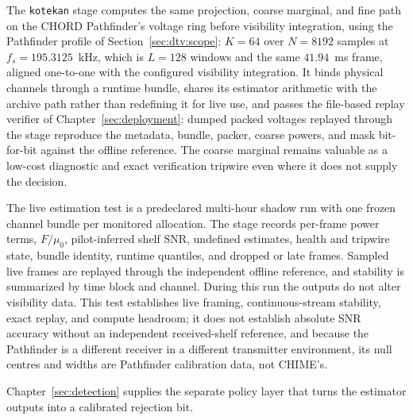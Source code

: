 The \texttt{kotekan} stage computes the same projection, coarse marginal, and fine path on the CHORD Pathfinder's voltage ring before visibility integration, using the Pathfinder profile of Section~\ref{sec:dtv:scope}: $K = 64$ over $N = 8192$ samples at $f_s = 195.3125$~kHz, which is $L = 128$ windows and the same $41.94$~ms frame, aligned one-to-one with the configured visibility integration. It binds physical channels through a runtime bundle, shares its estimator arithmetic with the archive path rather than redefining it for live use, and passes the file-based replay verifier of Chapter~\ref{sec:deployment}: dumped packed voltages replayed through the stage reproduce the metadata, bundle, packer, coarse powers, and mask bit-for-bit against the offline reference. The coarse marginal remains valuable as a low-cost diagnostic and exact verification tripwire even where it does not supply the decision.

The live estimation test is a predeclared multi-hour shadow run with one frozen channel bundle per monitored allocation. The stage records per-frame power terms, $F/\mu_0$, pilot-inferred shelf SNR, undefined estimates, health and tripwire state, bundle identity, runtime quantiles, and dropped or late frames. Sampled live frames are replayed through the independent offline reference, and stability is summarized by time block and channel. During this run the outputs do not alter visibility data. This test establishes live framing, continuous-stream stability, exact replay, and compute headroom; it does not establish absolute SNR accuracy without an independent received-shelf reference, and because the Pathfinder is a different receiver in a different transmitter environment, its null centres and widths are Pathfinder calibration data, not CHIME's.

Chapter~\ref{sec:detection} supplies the separate policy layer that turns the estimator outputs into a calibrated rejection bit.

